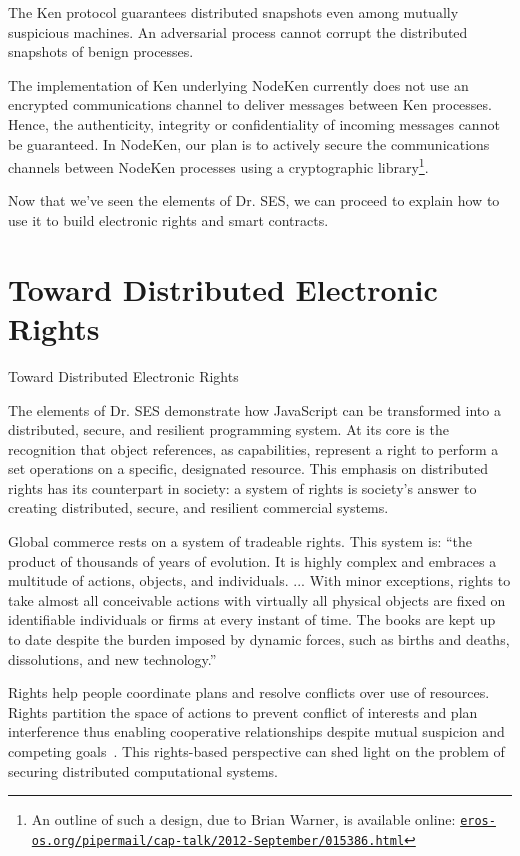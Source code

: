 \documentclass{llncs}
\newcommand{\myurl}[1]{{\href{http://#1}{\texttt{#1}}}}
\begin{document}
The Ken protocol guarantees distributed snapshots even among mutually suspicious machines. An adversarial process cannot corrupt the distributed snapshots of benign processes.

The implementation of Ken underlying NodeKen currently does not use an encrypted communications channel to deliver messages between Ken processes. Hence, the authenticity, integrity or confidentiality of incoming messages cannot be guaranteed. In NodeKen, our plan is to actively secure the communications channels between NodeKen processes using a cryptographic library\footnote{
%
An outline of such a design, due to Brian Warner, is available online: \myurl{eros-os.org/pipermail/cap-talk/2012-September/015386.html}}.

Now that we've seen the elements of Dr. SES, we can proceed to explain how to use it to build electronic rights and smart contracts.

\section{Toward Distributed Electronic Rights}
\label{towardErights}

Toward Distributed Electronic Rights

The elements of Dr. SES demonstrate how JavaScript can be transformed into a distributed, secure, and resilient programming system. At its core is the recognition that object references, as capabilities, represent a right to perform a set operations on a specific, designated resource. This emphasis on distributed rights has its counterpart in society: a system of rights is society's answer to creating distributed, secure, and resilient commercial systems.

Global commerce rests on a system of tradeable rights. This system is: ``the product of thousands of years of evolution. It is highly complex and embraces a multitude of actions, objects, and individuals. ... With minor exceptions, rights to take almost all conceivable actions with virtually all physical objects are fixed on identifiable individuals or firms at every instant of time. The books are kept up to date despite the burden imposed by dynamic forces, such as births and deaths, dissolutions, and new technology.''~\cite{jensen_specific_1995}

Rights help people coordinate plans and resolve conflicts over use of resources. Rights partition the space of actions to prevent conflict of interests and plan interference thus enabling cooperative relationships despite mutual suspicion and competing goals~\cite{steiner_essay_1994}. This rights-based perspective can shed light on the problem of securing distributed computational systems.
\end{document}
